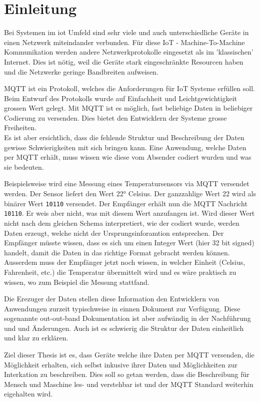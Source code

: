 \chapter{Einleitung}
\label{chap:einleitung}

Bei Systemen im \acrfull{iot} Umfeld sind sehr viele und auch unterschiedliche Geräte in einen Netzwerk miteindander verbunden. 
Für diese IoT - Machine-To-Machine Kommunikation werden andere Netzwerkprotokolle eingesetzt als im 'klassischen' Internet. Dies ist nötig, weil die Geräte stark eingeschränkte Resourcen haben und die Netzwerke geringe Bandbreiten aufweisen.

MQTT ist ein Protokoll, welches die Anforderungen für IoT Systeme erfüllen soll. Beim Entwurf des Protokolls wurde auf Einfachheit und Leichtgewichtigkeit grossen Wert gelegt. Mit MQTT ist es möglich, fast beliebige Daten in beliebiger Codierung zu versenden. Dies bietet den Entwicklern der Systeme grosse Freiheiten. \\
Es ist aber ersichtlich, dass die fehlende Struktur und Beschreibung der Daten gewisse Schwierigkeiten mit sich bringen kann. Eine Anwendung, welche Daten per MQTT erhält, muss wissen wie diese vom Absender codiert wurden und was sie bedeuten.

Beispielsweise wird eine Messung eines Temperatursensors via MQTT versendet werden. Der Sensor liefert den Wert 22° Celsius.
Der ganzzahlige Wert 22 wird als binärer Wert \texttt{10110} versendet.
Der Empfänger erhält nun die MQTT Nachricht \texttt{10110}. Er weis aber nicht, was mit diesem Wert anzufangen ist. Wird dieser Wert nicht nach dem gleichen Schema interpretiert, wie der codiert wurde, werden Daten erzeugt, welche nicht der Ursprungsinforamtion entsprechen.
Der Empfänger müsste wissen, dass es sich um einen Integer Wert (hier 32 bit signed) handelt, damit die Daten in das richtige Format gebracht werden können.
Ausserdem muss der Empfänger jetzt noch wissen, in welcher Einheit (Celsius, Fahrenheit, etc.) die Temperatur übermittelt wird und es wäre praktisch zu wissen, wo zum Beispiel die Messung stattfand.

Die Erezuger der Daten stellen diese Information den Entwicklern von Anwendungen zurzeit typischweise in einnen Dokument zur Verfügung. Diese sogenannte out-out-band Dokumentation ist aber aufwändig in der Nachführung und und Änderungen. Auch ist es schwierig die Struktur der Daten einheitlich und klar zu erklären.

Ziel dieser Thesis ist es, dass Geräte welche ihre Daten per MQTT versenden, die Möglichkeit erhalten, sich selbst inkusive ihrer Daten und Möglichkeiten zur Interkation zu beschreiben. Dies soll so getan werden, dass die Beschreibung für Mensch und Maschine les- und verstehbar ist und der MQTT Standard weiterhin eigehalten wird.